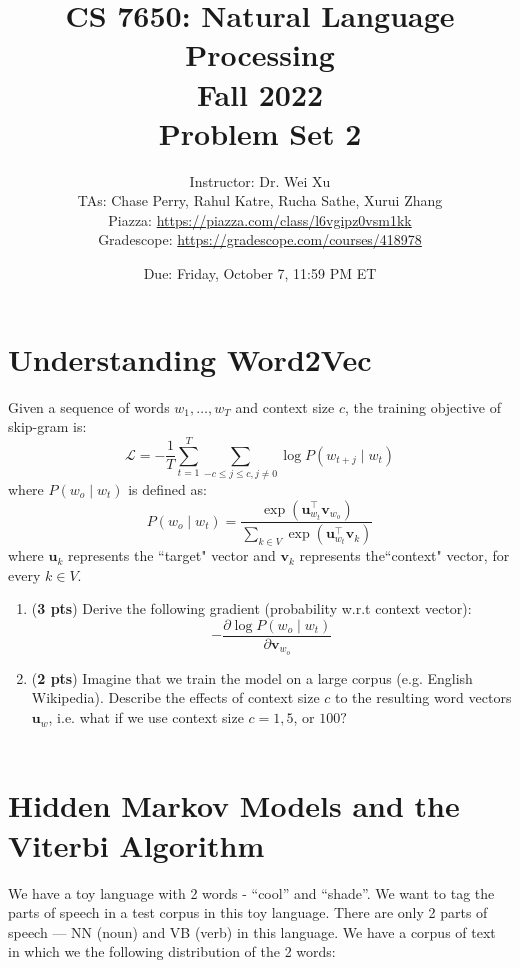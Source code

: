 \documentclass[11pt, letterpaper]{article}
\begin{document}
\title{CS 7650: Natural Language Processing \\ Fall 2022 \\ Problem Set 2}
\author{Instructor: Dr. Wei Xu \\ TAs: Chase Perry, Rahul Katre, Rucha Sathe, Xurui Zhang \\Piazza: \url{https://piazza.com/class/l6vgipz0vsm1kk}
\\Gradescope: \url{https://gradescope.com/courses/418978}}
\date{Due: Friday, October 7, 11:59 PM ET}
\maketitle

\section{Understanding Word2Vec}
Given a sequence of words $w_{1}, \ldots, w_{T}$ and context size $c$, the training objective of skip-gram is:
$$
\mathcal{L}=-\frac{1}{T} \sum_{t=1}^{T} \sum_{-c \leq j \leq c, j \neq 0} \log P\left(w_{t+j} \mid w_{t}\right)
$$
where $P\left(w_{o} \mid w_{t}\right)$ is defined as:
$$
P\left(w_{o} \mid w_{t}\right)=\frac{\exp \left(\mathbf{u}_{w_{t}}^{\top} \mathbf{v}_{w_{o}}\right)}{\sum_{k \in V} \exp \left(\mathbf{u}_{w_{t}}^{\top} \mathbf{v}_{k}\right)}
$$
where $\mathbf{u}_{k}$ represents the ``target" vector and $\mathbf{v}_{k}$ represents the``context" vector, for every $k \in V$.\\

\begin{enumerate}[label=(\alph*)]

\item (\textbf{3 pts}) Derive the following gradient (probability w.r.t context vector):
$$
-\frac{\partial \log P\left(w_{o} \mid w_{t}\right)}{\partial \mathbf{v}_{w_{o}}}
$$

\item (\textbf{2 pts}) Imagine that we train the model on a large corpus (e.g. English Wikipedia). Describe the effects of context size $c$ to the resulting word vectors $\mathbf{u}_{w}$, i.e. what if we use context size $c=1,5$, or $100 ?$\\\\

\end{enumerate}
    
\section{Hidden Markov Models and the Viterbi Algorithm}
    We have a toy language with 2 words - “cool” and “shade”. We want to tag the parts of speech in a test corpus in this toy language. There are only 2 parts of speech — NN (noun) and VB (verb) in this language. We have a corpus of text in which we the following distribution of the 2 words:
    
\end{document}
